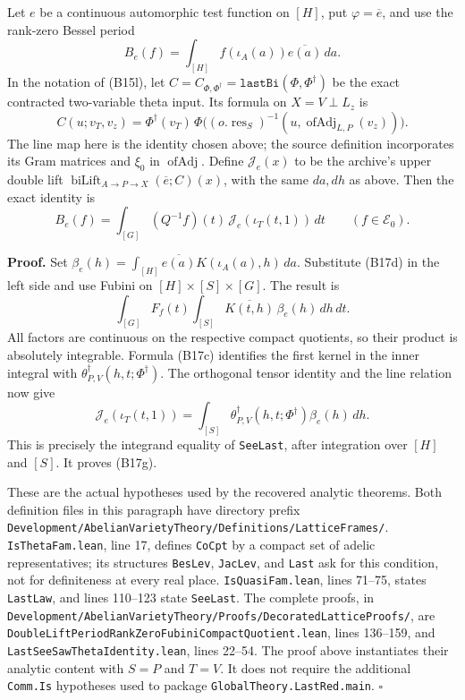 Let $e$ be a continuous automorphic test function on $[H]$, put
$\varphi=\overline e$, and use the rank-zero Bessel period
\[
 B_e(f)=\int_{[H]}f(\iota_A(a))\overline{e(a)}\,da .
\]
In the notation of (B15l), let
$C=C_{\Phi,\Phi^\dagger}=\texttt{lastBi}(\Phi,\Phi^\dagger)$
be the exact contracted two-variable theta input. Its formula
on $X=V\perp L_z$ is
\[
 C(u;v_T,v_z)
     =\Phi^\dagger(v_T)\,
       \Phi\bigl((o.\operatorname{res}_S)^{-1}
                       (u,\operatorname{ofAdj}_{L,P}(v_z))\bigr).
\]
The line map here is the identity chosen above; the source
definition incorporates its Gram matrices and $\xi_0$ in
$\operatorname{ofAdj}$. Define $\mathcal J_e(x)$ to be the
archive's upper double lift
$\operatorname{biLift}_{A\to P\to X}(\overline e;C)(x)$,
with the same $da,dh$ as above. Then the exact identity is
\begin{equation}
 B_e(f)=\int_{[G]}(Q^{-1}f)(t)\,
                 \mathcal J_e(\iota_T(t,1))\,dt
       \qquad(f\in\mathcal E_0).
\tag{B17g}
\end{equation}

\textbf{Proof.}
Set
$\beta_e(h)=\int_{[H]}\overline{e(a)}K(\iota_A(a),h)\,da$.
Substitute (B17d) in the left side and use Fubini on
$[H]\times[S]\times[G]$. The result is
\[
 \int_{[G]}F_f(t)\int_{[S]}
       \overline{K(t,h)}\,\beta_e(h)\,dh\,dt.
\]
All factors are continuous on the respective compact quotients,
so their product is absolutely integrable. Formula (B17c)
identifies the first kernel in the inner integral with
$\theta^\dagger_{P,V}(h,t;\Phi^\dagger)$.
The orthogonal tensor identity and the line relation now give
\[
 \mathcal J_e(\iota_T(t,1))
       =\int_{[S]}\theta^\dagger_{P,V}(h,t;\Phi^\dagger)
                         \beta_e(h)\,dh .
\]
This is precisely the integrand equality of
\texttt{SeeLast}, after integration over $[H]$ and $[S]$.
It proves (B17g).

These are the actual hypotheses used by the recovered analytic
theorems. Both definition files in this paragraph have directory
prefix
\texttt{Development/\allowbreak{}AbelianVarietyTheory/\allowbreak{}Definitions/\allowbreak{}LatticeFrames/}.
\texttt{IsThetaFam.lean}, line 17, defines
\texttt{CoCpt} by a compact set of adelic representatives;
its structures \texttt{BesLev}, \texttt{JacLev}, and
\texttt{Last} ask for this condition, not for definiteness at
every real place. \texttt{IsQuasiFam.lean}, lines 71--75,
states \texttt{LastLaw}, and lines 110--123 state
\texttt{SeeLast}. The complete proofs, in
\texttt{Development/\allowbreak{}AbelianVarietyTheory/\allowbreak{}Proofs/\allowbreak{}DecoratedLatticeProofs/}, are
\texttt{DoubleLiftPeriodRankZeroFubiniCompactQuotient.lean},
lines 136--159, and \texttt{LastSeeSawThetaIdentity.lean},
lines 22--54. The proof above instantiates their analytic
content with $S=P$ and $T=V$. It does not require the
additional \texttt{Comm.Is} hypotheses used to package
\texttt{GlobalTheory.LastRed.main}. \hfill$\square$

